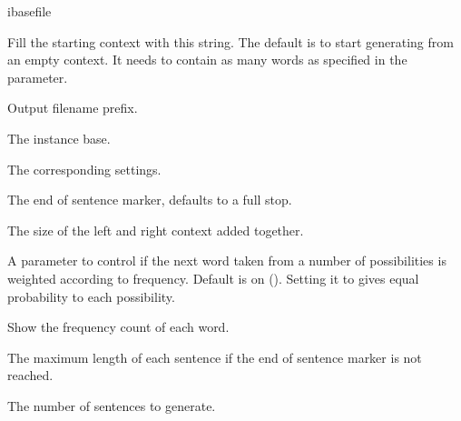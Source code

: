 \documentclass[a4paper,10pt,twoside]{report}
\begin{document}
\begin{varlist}{ibasefile}
\item[start] Fill the starting context with this string. The default
  is to start generating from an empty context. It needs to contain as
  many words as specified in the  parameter.
\item[filename] Output filename prefix.
\item[ibasefile] The instance base.
\item[timbl] The corresponding \Timbl{} settings.
\item[end] The end of sentence marker, defaults to a full stop.
\item[ws] The size of the left and right context added together.
\item[mode] A parameter to control if the next word taken from a
  number of possibilities is weighted according to frequency. Default
  is on (). Setting it to  gives equal probability to
  each possibility.
\item[sc] Show the frequency count of each word.
\item[len] The maximum length of each sentence if the end of sentence
  marker is not reached.
\item[n] The number of sentences to generate.
\end{varlist}



\end{document}
